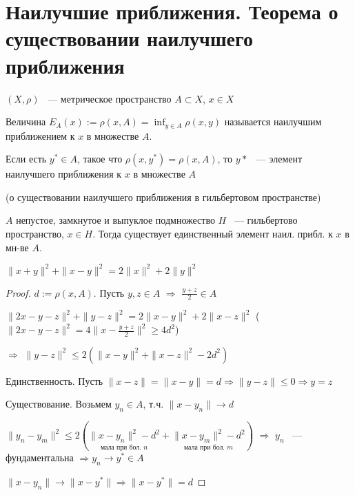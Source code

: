 \section{Наилучшие приближения. Теорема о существовании наилучшего приближения}

\begin{definition}
    $(X, \rho)$ ~--- метрическое пространство $A\subset X$, $x\in X$
    
    Величина $E_A(x) := \rho(x, A) = \inf_{y \in A} \rho(x, y)$ называется наилучшим приближением
    к $x$ в множестве $A$.
   \end{definition}
   
   \begin{definition}
    Если есть $y^*\in A$, такое что $\rho(x, y^*) = \rho(x, A)$, то $y*$ ~--- элемент наилучшего
    приближения к $x$ в множестве $A$
   \end{definition}
   
   \begin{theorem}(о существовании наилучшего приближения в гильбертовом пространстве)
   
   $A$ непустое, замкнутое и выпуклое подмножество $H$ ~--- гильбертово пространство, $x\in H$.
   Тогда существует единственный элемент наил. прибл. к $x$ в мн-ве $A$.
   \end{theorem}
   
   \begin{lemma}
   $\|x + y\|^2 + \|x-y\|^2  = 2 \|x\|^2 + 2\|y\|^2$
   \end{lemma}
   
   \begin{proof}
   $d := \rho(x, A)$. Пусть $y, z \in A$ $\Rightarrow$ $\frac{y + z}{2}\in A$
   
   $\|2x -y - z\|^2 + \|y - z\|^2 = 2\|x-y\|^2 + 2\|x-z\|^2$ ($\|2x - y - z\|^2 = 4\|x - \frac{y + z}{2}\|^2 \ge 4d^2$)
   
   $\Rightarrow $ $\|y - z\|^2\le 2(\|x - y\|^2 + \| x- z\|^2 - 2d^2)$
   
   Единственность. Пусть $\|x - z\| = \|x - y\| = d \Rightarrow \|y - z\|\le 0 \Rightarrow y = z$
   
   Существование. Возьмем $y_n \in A$, т.ч. $\|x - y_n\|\rightarrow d$
   
   $\|y_n - y_m\|^2 \le 2(\underset{\text{мала при бол. $n$}}{\|x - y_n\|^2  - d^2}+
    \underset{\text{мала при бол. $m$}}{\| x- y_m\|^2 - d^2})$ $\Rightarrow$ $y_n$ ~--- 
    фундаментальна $\Rightarrow y_n\rightarrow y^* \in A$
    
    $\|x - y_n\|\rightarrow \|x - y^*\| \Rightarrow \|x - y^*\| = d$
    \end{proof}

\newpage

